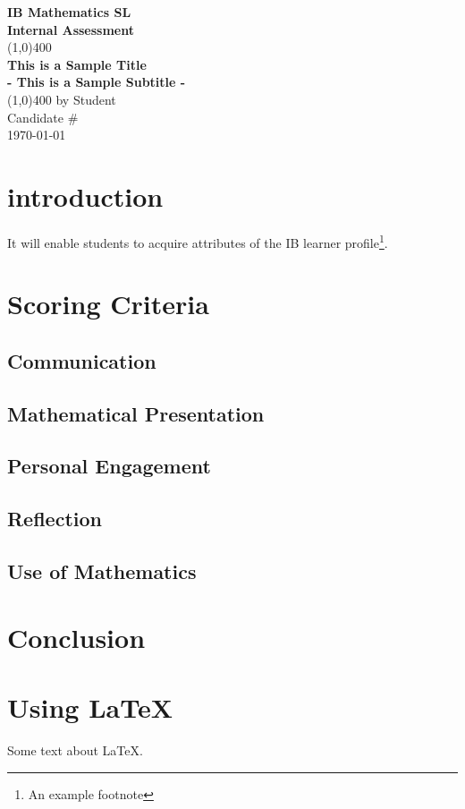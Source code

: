 \documentclass[11pt]{article}
\begin{document}
\begin{titlepage}
\begin{center}
\vspace{1cm}
\Large{\textbf{IB Mathematics SL}}\\
\Large{\textbf{Internal Assessment}}\\
\vfill
\line(1,0){400}\\[1mm]
\huge{\textbf{This is a Sample Title}}\\[3mm]
\Large{\textbf{- This is a Sample Subtitle -}}\\[1mm]
\line(1,0){400}
\vfill
by Student\\
Candidate \# \\
\today \\
\end{center}
\end{titlepage}

\tableofcontents
\thispagestyle{empty}
\clearpage
\setcounter{page}{1}

\section{introduction}
It will enable students to acquire attributes of the IB learner profile\footnote{An example footnote}.

\section{Scoring Criteria}

\subsection{Communication}

\subsection{Mathematical Presentation}

\subsection{Personal Engagement}

\subsection{Reflection}

\subsection{Use of Mathematics}

\section{Conclusion}

\section{Using \LaTeX}
Some text about \LaTeX.
\end{document}
